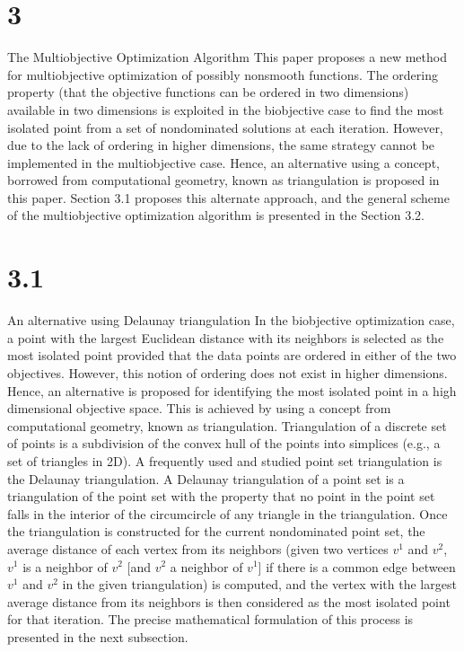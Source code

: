 \section{3}{The Multiobjective Optimization Algorithm}
This paper proposes a new method for multiobjective optimization of possibly 
nonsmooth functions. The ordering property (that the objective functions can be
ordered in two dimensions) available in two dimensions is exploited in the
biobjective case to find the most isolated point from a set of nondominated
solutions at each iteration. However, due to the lack of ordering in higher
dimensions, the same strategy cannot be implemented in the multiobjective case.
Hence, an alternative using a concept, borrowed from computational geometry,
known as triangulation is proposed in this paper.  Section 3.1 proposes this
alternate approach, and the general scheme of the multiobjective optimization
algorithm is presented in the Section 3.2.

\section{3.1}{An alternative using Delaunay triangulation}
In the biobjective optimization case, a point with the largest Euclidean 
distance with its neighbors is selected as the most isolated point provided 
that the data points are ordered in either of the two objectives. However, 
this notion of ordering does not exist in higher dimensions. Hence, an alternative 
is proposed for identifying the most isolated point in a high dimensional 
objective space. This is achieved by using a concept from computational geometry, 
known as triangulation. Triangulation of a discrete set of points is a
subdivision of the convex hull of the points into simplices (e.g., a set of 
triangles in 2D). A frequently used and studied point set triangulation is the
Delaunay triangulation. A Delaunay triangulation of a point set is a
triangulation of the point set with the property that no point in the point set
falls in the interior of the circumcircle of any triangle in the triangulation.
Once the triangulation is constructed for the current nondominated point set,
the average distance of each vertex from its neighbors (given two vertices
$v^1$ and $v^2$, $v^1$ is a neighbor of $v^2$ [and $v^2$ a neighbor of $v^1$]
if there is a common edge between $v^1$ and $v^2$ in the given triangulation)
is computed, and the vertex with the largest average distance from its
neighbors is then considered as the most isolated point for that iteration. The
precise mathematical formulation of this process is presented in the next
subsection. 

